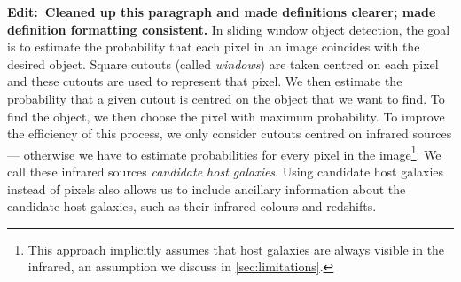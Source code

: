 \documentclass[fleqn,usenatbib,usedcolumn]{mnras}
\newcommand{\edit}[1]{{\bf Edit:~{#1}}}
\begin{document}
    \edit{Cleaned up this paragraph and made definitions clearer; made definition formatting consistent.} In sliding window object detection, the goal is to estimate the probability that each pixel in an image coincides with the desired object. Square cutouts (called \emph{windows}) are taken centred on each pixel and these cutouts are used to represent that pixel. We then estimate the probability that a given cutout is centred on the object that we want to find. To find the object, we then choose the pixel with maximum probability. To improve the efficiency of this process, we only consider cutouts centred on infrared sources --- otherwise we have to estimate probabilities for every pixel in the image\footnote{This approach implicitly assumes that host galaxies are always visible in the infrared, an assumption we discuss in \autoref{sec:limitations}.}. We call these infrared sources \emph{candidate host galaxies}. Using candidate host galaxies instead of pixels also allows us to include ancillary information about the candidate host galaxies, such as their infrared colours and redshifts.
\end{document}
